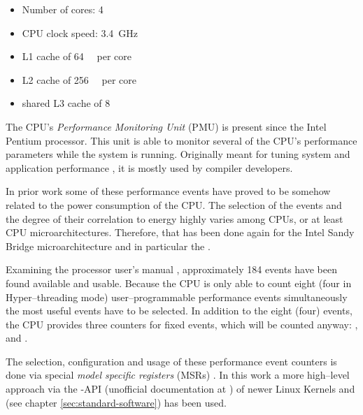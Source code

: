 \begin{itemize}

\item Number of cores: 4

\item CPU clock speed: \SI{3.4}{\giga\hertz}

\item L1 cache of \SI{64}{\kibi\byte} per core\cite{intel2011softdev1}

\item L2 cache of \SI{256}{\kibi\byte} per core\cite{intel2011softdev1}

\item shared L3 cache of \SI{8}{\mebi\byte}\cite{intel2011softdev1}

\end{itemize}


\label{sec:pmu}

The CPU's \emph{Performance Monitoring Unit} (PMU) is present since the
Intel\TReg{} Pentium processor. This unit is able to monitor several of the
CPU's performance parameters while the system is running. Originally meant for
tuning system and application performance \cite{intel2011softdev3b}, it is
mostly used by compiler developers.

In prior work \cite{bellosa2000benefits,snowdon2010operating,
weissel2002process,kellner03tempcontrol,bertran2010decomposable} some of these
performance events have proved to be somehow related to the power consumption of
the CPU. The selection of the events and the degree of their correlation to
energy highly varies among CPUs, or at least CPU microarchitectures.
Therefore, that has been done again for the Intel\TReg{} San\-dy Bridge
microarchitecture and in particular the \JWPcpu{}.

Examining the processor user's manual \cite{intel2011events}, approximately 184
events have been found available and usable. Because the CPU is only able to
count eight (four in Hyper--threading \cite{HT} mode) user--programmable
performance events simultaneously \cite{intel2011softdev1} the most useful
events have to be selected. In addition to the eight (four) events, the CPU
provides three counters for fixed events, which will be counted anyway:
,  and
.

The selection, configuration and usage of these performance event counters is
done via special \emph{model specific registers} (MSRs)
\cite{intel2011softdev3b}. In this work a more high--level approach via the
-API (unofficial documentation at
\cite{weaver2011perfevents}) of newer Linux Kernels and \JWTlibpfm{} (see
chapter \ref{sec:standard-software}) has been used.


